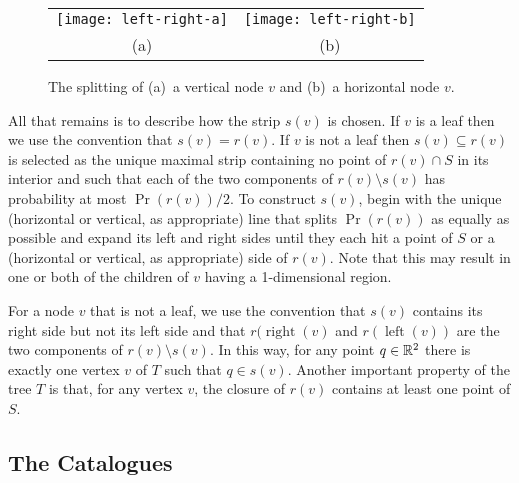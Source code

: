 \documentclass[lotsofwhite,charterfonts]{patmorin}
\DeclareMathOperator{\lft}{left}
\DeclareMathOperator{\rght}{right}
\newcommand{\depth}{d}
\begin{document}
\begin{figure}
  \begin{center}
    \begin{tabular}{cc}
      \texttt{[image: left-right-a]} & \texttt{[image: left-right-b]} \\
      (a) & (b)
    \end{tabular}
  \end{center}
  \caption{The splitting of (a)~a vertical node $v$ and (b)~a horizontal
  node $v$.}
\end{figure}

All that remains is to describe how the strip $s(v)$ is chosen. If $v$
is a leaf then we use the convention that $s(v)=r(v)$.  If $v$ is
not a leaf then $s(v)\subseteq r(v)$ is selected as the unique maximal
strip containing no point of $r(v)\cap S$ in its interior and such
that each of the two components of $r(v)\setminus s(v)$ has
probability at most $\Pr(r(v))/2$.  To construct $s(v)$, begin with
the unique (horizontal or vertical, as appropriate) line that splits
$\Pr(r(v))$ as equally as possible and expand its left and right sides
until they each hit a point of $S$ or a (horizontal or vertical, as
appropriate) side of $r(v)$. Note that this may result in one or both
of the children of $v$ having a 1-dimensional region.

For a node $v$ that is not a leaf, we use the convention that $s(v)$
contains its right side but not its left side and that $r(\rght(v)$
and $r(\lft(v))$ are the two components of $r(v)\setminus s(v)$.  In
this way, for any point $q\in \mathbb{R}^2$ there is exactly one vertex $v$ of
$T$ such that $q\in s(v)$.  Another important property of the tree $T$
is that, for any vertex $v$, the closure of $r(v)$ contains at least
one point of $S$.


\subsection{The Catalogues}
\end{document}

